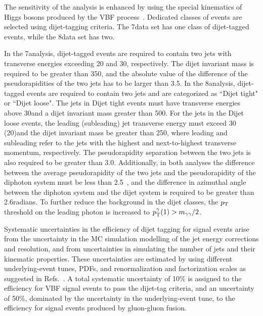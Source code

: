 \documentclass[11pt,twoside,a4paper,cmspaper,final,collab]{cms-tdr}
\begin{document}
The sensitivity of the analysis is enhanced by using
the special kinematics of Higgs bosons produced by the VBF process~\cite{Ballestrero:2008gf}.
Dedicated classes of events are selected using dijet-tagging criteria.
The 7\TeV data set has one class of dijet-tagged events, while
the 8\TeV data set has two.

In the 7\TeV analysis, dijet-tagged events are required to contain two jets with transverse
energies exceeding 20 and 30\GeV, respectively. The dijet invariant mass is required to
be greater than  350\GeV, and the absolute value of the difference of the pseudorapidities of the
two jets has to be larger than 3.5.
In the 8\TeV analysis, dijet-tagged events are required to
contain two jets and are categorized as ``Dijet tight" or ``Dijet loose".
The jets in Dijet tight events must have transverse energies above 30\GeV and  a
dijet invariant mass greater than  500\GeV.
For the jets in the Dijet loose events, the leading (subleading) jet transverse energy
must exceed 30 (20)\GeV and the dijet invariant mass be greater than
250\GeV, where leading and subleading refer to the jets with the highest and
next-to-highest transverse momentum, respectively.
The pseudorapidity separation between the two jets
is also required to be greater than 3.0. Additionally, in both analyses the difference between
the average pseudorapidity of the two jets and the pseudorapidity of the diphoton system must
be less than 2.5~\cite{Rainwater:1996ud}, and the difference in azimuthal
angle between the diphoton system and the dijet system is required to
be greater than 2.6\unit{radians}.
To further reduce the background in the dijet classes, the $p_{\mathrm{T}}$ threshold on the leading
photon is increased to $p_{\mathrm{T}}^{\gamma}(1) > m_{\gamma\gamma}/2$.

Systematic uncertainties in the efficiency of dijet tagging for
signal events arise from the uncertainty in the MC simulation modelling of the jet energy
corrections and resolution, and from uncertainties in simulating
the number of jets and their kinematic properties.
These uncertainties are estimated by using  different underlying-event tunes,
PDFs, and renormalization and factorization scales
as suggested in Refs.~\cite{LHCHiggsCrossSectionWorkingGroup:2011ti,Dittmaier:2012vm}.
A total systematic uncertainty of 10\% is assigned to the efficiency
for VBF signal events to pass the dijet-tag criteria, and an
uncertainty of 50\%, dominated by the uncertainty in the
underlying-event tune, to the efficiency for signal events
produced by gluon-gluon fusion.
\end{document}
